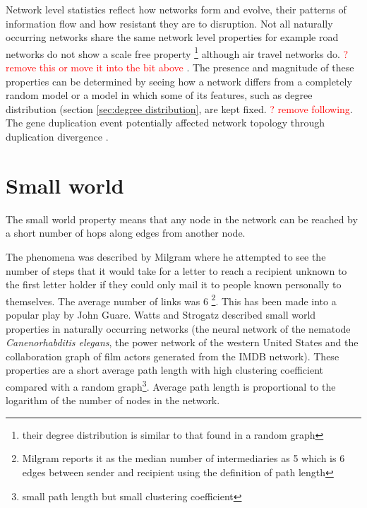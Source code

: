 Network level statistics reflect how networks form and evolve, their patterns of information flow and how resistant they are to disruption.
Not all naturally occurring networks share the same network level properties for example road networks do not show a scale free property \cite{xie2007measuring} \footnote{their degree distribution is similar to that found in a random graph} although air travel networks do\cite{boccaletti2006complex}.
\textcolor{red}{? remove this or move it into the bit above}
.
The presence and magnitude of these properties can be determined by seeing how a network differs from a completely random model or a model in which some of its features, such as degree distribution (section \ref{sec:degree distribution}, are kept fixed. \textcolor{red}{? remove following}. The gene duplication event \cite{grant2016molecular} potentially affected network topology through duplication divergence \cite{ispolatov2005duplication}\cite{taylor2004duplication}\cite{wagner2003global}. 


\section{Small world}
\label{sec:Small world}
The small world property means that any node in the network can be reached by a short number of hops along edges from another node. 

The phenomena was described by Milgram \cite{milgram1967small} where he attempted to see the number of steps that it would take for a letter to reach a recipient unknown to the first letter holder if they could only mail it to people known personally to themselves. The average number of links was 6 \footnote{Milgram reports it as the median number of intermediaries as 5 which is 6 edges between sender and recipient using the definition of path length}. This has been made into a popular play by John Guare. Watts and Strogatz \cite{watts1998collective} described small world properties in naturally occurring networks (the neural network of the nematode \textit{Canenorhabditis elegans}, the power network of the western United States and the collaboration graph of film actors generated from the IMDB network). These properties are a short average path length with high clustering coefficient compared with a random graph\footnote{small path length but small clustering coefficient}. Average path length is proportional to the logarithm of the number of nodes in the network. 


